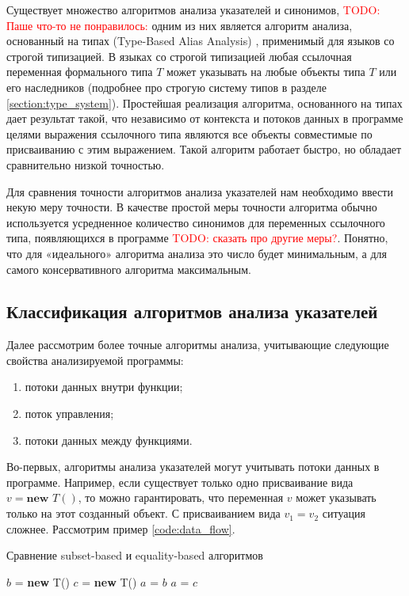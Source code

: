 \documentclass[14pt,titlepage]{extarticle}
\newcommand{\NEW}{\textbf{new }}
\newcommand{\todo}[1]{\textcolor{red}{\eng{TODO}: #1}}
\newcommand{\eng}[1]{{\English#1}}
\begin{document}
    Существует множество алгоритмов анализа указателей и синонимов,
    \todo{Паше что-то не понравилось:}
    одним из них является алгоритм анализа, основанный на типах
    (\eng{Type-Based Alias Analysis}) \cite{diwan_tbaa},
    применимый для языков со строгой типизацией.
    В языках со строгой типизацией любая ссылочная переменная формального типа
    $T$ может указывать на любые объекты типа $T$ или его наследников
    (подробнее про строгую систему типов в разделе \ref{section:type_system}).
    Простейшая реализация алгоритма, основанного на типах дает результат
    такой, что независимо от контекста и потоков данных в программе целями
    выражения ссылочного типа являются все объекты совместимые по
    присваиванию с этим выражением.
    Такой алгоритм работает быстро, но обладает сравнительно низкой точностью.

    Для сравнения точности алгоритмов анализа указателей нам необходимо ввести
    некую меру точности. В качестве простой меры точности алгоритма обычно
    используется усредненное количество синонимов для переменных ссылочного
    типа, появляющихся в программе \cite{hind_pointer_analysis_not_solved_yet}
    \todo{сказать про другие меры?}.
    Понятно, что для «идеального» алгоритма анализа это число будет
    минимальным, а для самого консервативного алгоритма максимальным.

    \subsection{Классификация алгоритмов анализа указателей}
    \label{section:analysis_overview}

      Далее рассмотрим более точные алгоритмы анализа, учитывающие следующие
      свойства анализируемой программы:
      \begin{enumerate}
        \item потоки данных внутри функции;
        \item поток управления;
        \item потоки данных между функциями.
      \end{enumerate}

      Во-первых, алгоритмы анализа указателей могут учитывать потоки данных в
      программе.
      Например, если существует только одно присваивание вида $v = \NEW T()$,
      то можно гарантировать, что переменная $v$ может указывать только на этот
      созданный объект.
      С присваиванием вида $v_1 = v_2$ ситуация сложнее. Рассмотрим пример
      \ref{code:data_flow}.
      \begin{algorithm}
        \caption{Сравнение \eng{subset-based} и \eng{equality-based} алгоритмов}
        \label{code:data_flow}
        \begin{algorithmic}[1]
          \STATE $b$ = \NEW T()
          \STATE $c$ = \NEW T()
          \STATE $a$ = $b$
          \STATE $a$ = $c$
        \end{algorithmic}
      \end{algorithm}
\end{document}
